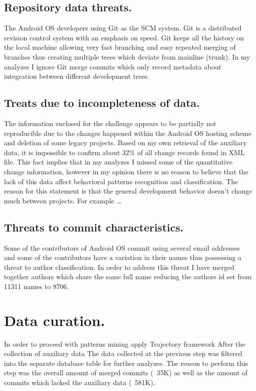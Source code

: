 \documentclass[a4paper,10pt]{article}
\numberwithin{equation}{subsection}
\begin{document}
\subsection{Repository data threats.}
The Android OS developers using Git as the SCM system. Git is a distributed revision control system 
with an emphasis on speed. Git keeps all the history on the local machine allowing very fast 
branching and easy repeated merging of branches thus creating multiple trees which deviate from 
mainline (trunk). In my analyzes I ignore Git merge commits which only record metadata about 
integration between different development trees. 

\subsection{Treats due to incompleteness of data.}
The information enclosed for the challenge appears to be partially not reproducible due to the 
changes happened within the Android OS hosting scheme and deletion of some legacy projects.
Based on my own retrieval of the auxiliary data, it is impossible to confirm about 32\% of all
change records found in XML file. This fact implies that in my analyzes I missed some of the 
quantitative change information, however in my opinion there is no reason to believe that 
the lack of this data affect behavioral patterns recognition and classification. The reason
for this statement is that the general development behavior doesn't change much between projects.
For example \ldots

\subsection{Threats to commit characteristics.}
Some of the contributors of Android OS commit using several email addresses and some of the 
contributors have a variation in their names thus possessing a threat to author classification.
In order to address this threat I have merged together authors which share the same full name
reducing the authors id set from 11311 names to 8706.

\section{Data curation.}
In order to proceed with patterns mining apply Trajectory framework After the collection of auxiliary data 
The data collected at the previous step was filtered into the separate database table for further analyzes.
The reason to perform this step was the overall amount of merged commits (~35K) as well as the amount of 
commits which lacked the auxiliary data (~581K).
\end{document}
